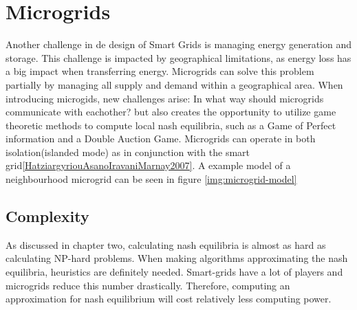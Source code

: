 \newpage
\section{Microgrids}\label{microgrids}


Another challenge in de design of Smart Grids is managing energy generation and storage. This challenge is impacted by geographical limitations, as energy loss has a big  impact when transferring energy.
Microgrids can solve this problem partially by managing all supply and demand within a geographical area. When introducing microgids, new challenges arise: In what way should microgrids communicate with eachother? but also creates the opportunity to utilize game theoretic methods to compute local nash equilibria, such as a Game of Perfect information and a Double Auction Game.
Microgrids can operate in both isolation(islanded mode) as in conjunction with the smart grid\ref{HatziargyriouAsanoIravaniMarnay2007}. 
A example model of a neighbourhood microgrid can be seen in figure \ref{img:microgrid-model}



\subsection{Complexity}
As discussed in chapter two, calculating nash equilibria is almost as hard as calculating NP-hard problems. When making algorithms approximating the nash equilibria, heuristics are definitely needed. Smart-grids have a lot of players and microgrids reduce this number drastically. Therefore, computing an approximation for nash equilibrium will cost relatively less computing power.


